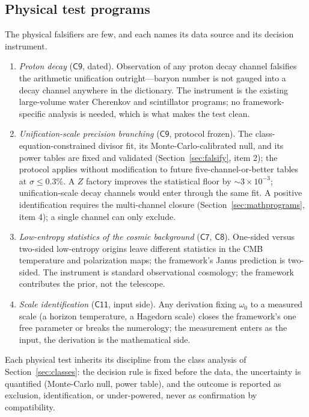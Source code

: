 \subsection{Physical test programs}\label{sec:physical}

The physical falsifiers are few, and each names its data source and its decision
instrument.

\begin{enumerate}[leftmargin=1.6em]
\item \emph{Proton decay} ($\mathsf{C9}$, dated). Observation of any proton decay channel
falsifies the arithmetic unification outright---baryon number is not gauged into a decay
channel anywhere in the dictionary. The instrument is the existing large-volume water
Cherenkov and scintillator programs; no framework-specific analysis is needed, which is
what makes the test clean.
\item \emph{Unification-scale precision branching} ($\mathsf{C9}$, protocol frozen). The
class-equation-constrained divisor fit, its Monte-Carlo-calibrated null, and its power
tables are fixed and validated (Section~\ref{sec:falsify}, item 2); the protocol applies
without modification to future five-channel-or-better tables at $\sigma\leq0.3\%$. A $Z$
factory improves the statistical floor by $\sim3\times10^{-3}$; unification-scale decay
channels would enter through the same fit. A positive identification requires the
multi-channel closure (Section~\ref{sec:mathprograms}, item 4); a single channel can only
exclude.
\item \emph{Low-entropy statistics of the cosmic background} ($\mathsf{C7}$, $\mathsf{C8}$).
One-sided versus two-sided low-entropy origins leave different statistics in the CMB
temperature and polarization maps; the framework's Janus prediction is two-sided. The
instrument is standard observational cosmology; the framework contributes the prior, not
the telescope.
\item \emph{Scale identification} ($\mathsf{C11}$, input side). Any derivation fixing
$\omega_{0}$ to a measured scale (a horizon temperature, a Hagedorn scale) closes the
framework's one free parameter or breaks the numerology; the measurement enters as the
input, the derivation is the mathematical side.
\end{enumerate}

Each physical test inherits its discipline from the class analysis of
Section~\ref{sec:classes}: the decision rule is fixed before the data, the uncertainty is
quantified (Monte-Carlo null, power table), and the outcome is reported as exclusion,
identification, or under-powered, never as confirmation by compatibility.

